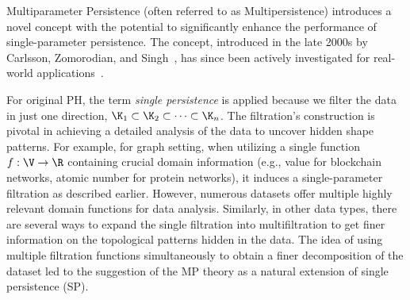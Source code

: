 
Multiparameter Persistence (often referred to as Multipersistence) introduces a novel concept with the potential to significantly enhance the performance of single-parameter persistence. The concept, introduced in the late 2000s by Carlsson, Zomorodian, and Singh~\cite{carlsson2007theory,carlsson2009computing}, has since been actively investigated for real-world applications~\cite{botnan2022introduction}.



\begin{table}
\vspace{-.1in}
\caption{Generic Bifiltration \label{tab:bifiltration}}
\vspace{-.1in}
\end{table}

 
For original PH, the term \textit{single persistence} is applied because we filter the data in just one direction, $\K_1\subset \K_2\subset\dots\subset\K_n$. The filtration's construction is pivotal in achieving a detailed analysis of the data to uncover hidden shape patterns. For example, for graph setting, when utilizing a single function $f:\V\to\R$ containing crucial domain information (e.g., value for blockchain networks, atomic number for protein networks), it induces a single-parameter filtration as described earlier. However, numerous datasets offer multiple highly relevant domain functions for data analysis. Similarly, in other data types, there are several ways to expand the single filtration into multifiltration to get finer information on the topological patterns hidden in the data. The idea of using multiple filtration functions simultaneously to obtain a finer decomposition of the dataset led to the suggestion of the MP theory as a natural extension of single persistence (SP).

